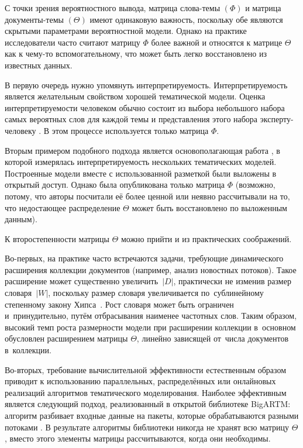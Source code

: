 С точки зрения вероятностного вывода, матрица слова-темы $(\Phi)$ и матрица документы-темы $(\Theta)$ имеют одинаковую важность, поскольку обе являются скрытыми параметрами вероятностной модели. Однако на практике исследователи часто считают матрицу $\Phi$ более важной и относятся к матрице $\Theta$ как к чему-то вспомогательному, что может быть легко восстановлено из известных данных.

В первую очередь нужно упомянуть интерпретируемость. Интерпретируемость является желательным свойством хорошей тематической модели. Оценка интерпретируемости человеком обычно состоит из выбора небольшого набора самых вероятных слов для каждой темы и представления этого набора эксперту-человеку \cite{roder2015exploring}. В этом процессе используется только матрица $\Phi$.

Вторым примером подобного подхода является основополагающая работа \cite{rtl}, в которой измерялась интерпретируемость нескольких тематических моделей. Построенные модели вместе с использованной разметкой были выложены в открытый доступ. Однако была опубликована только матрица $\Phi$ (возможно, потому, что авторы посчитали её более ценной или неявно рассчитывали на то, что недостающее распределение $\Theta$ может быть восстановлено по выложенным данным).

К второстепенности матрицы $\Theta$ можно прийти и из практических соображений.

Во-первых, на практике часто встречаются задачи, требующие динамического расширения коллекции документов (например, анализ новостных потоков). Такое расширение может существенно увеличить~$|D|$, практически не изменив размер словаря~$|W|$, поскольку размер словаря увеличивается по~сублинейному степенному закону Хипса~\cite{egghe07untangling}. Рост словаря может быть ограничен и~принудительно, путём отбрасывания наименее частотных слов. Таким образом, высокий темп роста размерности модели при расширении коллекции в~основном обусловлен расширением матрицы $\Theta$, линейно зависящей от~числа документов в~коллекции.

Во-вторых, требование вычислительной эффективности естественным образом приводит к использованию параллельных, распределённых или онлайновых реализаций алгоритмов тематического моделирования. Наиболее эффективным является следующий подход, реализованный в открытой библиотеке BigARTM: алгоритм разбивает входные данные на пакеты, которые обрабатываются разными потоками \cite{frei2016parallel}. В результате алгоритмы библиотеки никогда не хранят всю матрицу $\Theta$, вместо этого элементы матрицы рассчитываются, когда они необходимы.

